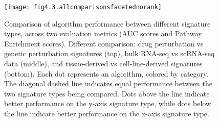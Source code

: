 \begin{figure}[htbp]
    \centering
    \texttt{[image: fig4.3.allcomparisonsfacetednorank]}
    \caption[Comparison of algorithm performance between different signature types.]{Comparison of algorithm performance between different signature types, across two evaluation metrics (\gls{AUC} scores and Pathway Enrichment scores). Different comparison: drug perturbation vs genetic perturbation signatures (top), bulk \gls{RNA-seq} vs \gls{scRNA-seq} data (middle), and tissue-derived vs cell-line-derived signatures (bottom). Each dot represents an algorithm, colored by category. The diagonal dashed line indicates equal performance between the two signature types being compared. Dots above the line indicate better performance on the y-axis signature type, while dots below the line indicate better performance on the x-axis signature type.}
    \label{fig:fig4.3.allcomparisonsfacetednorank}
\end{figure}


